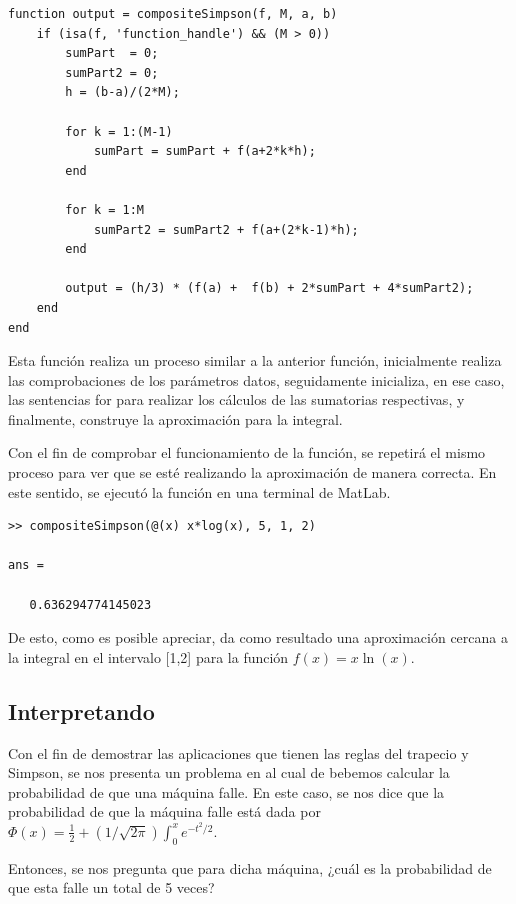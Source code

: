 \documentclass[english,notitlepage,letterpaper, 10pt]{article} %
\begin{document}
\begin{enumerate}[a)]
   \begin{lstlisting}
function output = compositeSimpson(f, M, a, b)
    if (isa(f, 'function_handle') && (M > 0))
        sumPart  = 0;
        sumPart2 = 0;
        h = (b-a)/(2*M);

        for k = 1:(M-1)
            sumPart = sumPart + f(a+2*k*h);
        end

        for k = 1:M
            sumPart2 = sumPart2 + f(a+(2*k-1)*h);
        end

        output = (h/3) * (f(a) +  f(b) + 2*sumPart + 4*sumPart2);
    end
end
   \end{lstlisting}

    Esta función realiza un proceso similar a la anterior función, inicialmente realiza las comprobaciones de los parámetros datos, seguidamente inicializa, en ese caso, las sentencias for para realizar los cálculos de las sumatorias respectivas, y finalmente, construye la aproximación para la integral.

    Con el fin de comprobar el funcionamiento de la función, se repetirá el mismo proceso para ver que se esté realizando la aproximación de manera correcta. En este sentido, se ejecutó la función en una terminal de MatLab.

    \begin{lstlisting}
>> compositeSimpson(@(x) x*log(x), 5, 1, 2)

ans =

   0.636294774145023
    \end{lstlisting}

    De esto, como es posible apreciar, da como resultado una aproximación cercana a la integral en el intervalo [1,2] para la función $f(x) = x \ln(x)$.

\end{enumerate}

\subsection{Interpretando}

    Con el fin de demostrar las aplicaciones que tienen las reglas del trapecio y Simpson, se nos presenta un problema en al cual de bebemos calcular la probabilidad de que una máquina falle. En este caso, se nos dice que la probabilidad de que la máquina falle está dada por $\Phi(x) = \frac{1}{2}+(1/\sqrt{2\pi}) \int_0^x e^{-t^2/2}$.

    Entonces, se nos pregunta que para dicha máquina, ¿cuál es la probabilidad de que esta falle un total de 5 veces?
\end{document}

